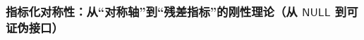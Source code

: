 \subsubsection{指标化对称性：从“对称轴”到“残差指标”的刚性理论（从 \texorpdfstring{$\mathsf{NULL}$}{NULL} 到可证伪接口）}\label{subsec:xi-certificate-coherence-orthogonal-axis-capacity}



\endinput
